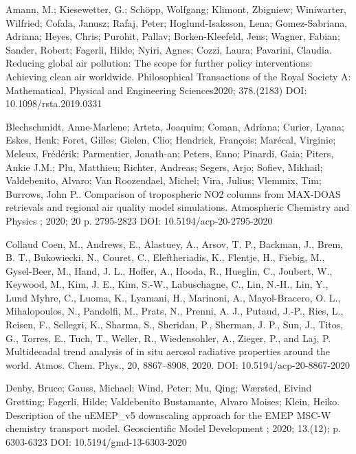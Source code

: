 \enlargethispage{\baselineskip}
\begin{list}{}{\setlength{\leftmargin}{15pt}\setlength{\itemindent}{-\leftmargin}}\small
\item[]
Amann, M.; Kiesewetter, G.; Schöpp, Wolfgang; Klimont, Zbigniew; Winiwarter, Wilfried; Cofala, Janusz; Rafaj, Peter; Hoglund-Isaksson, Lena; Gomez-Sabriana, Adriana; Heyes, Chris; Purohit, Pallav; Borken-Kleefeld, Jens; Wagner, Fabian; Sander, Robert; Fagerli, Hilde; Nyiri, Agnes; Cozzi, Laura; Pavarini, Claudia.
Reducing global air pollution: The scope for further policy interventions: Achieving clean air worldwide.
Philosophical Transactions of the Royal Society A: Mathematical, Physical and Engineering Sciences2020; 378.(2183)
DOI: 10.1098/rsta.2019.0331

\item[]
Blechschmidt, Anne-Marlene; Arteta, Joaquim; Coman, Adriana; Curier, Lyana; Eskes, Henk; Foret, Gilles; Gielen, Clio; Hendrick, François; Marécal, Virginie; Meleux, Frédérik; Parmentier, Jonath-an; Peters, Enno; Pinardi, Gaia; Piters, Ankie J.M.; Plu, Matthieu; Richter, Andreas; Segers, Arjo; Sofiev, Mikhail; Valdebenito, Alvaro; Van Roozendael, Michel; Vira, Julius; Vlemmix, Tim; Burrows, John P..
Comparison of tropospheric NO2 columns from MAX-DOAS retrievals and regional air quality model simulations.
Atmospheric Chemistry and Physics ; 2020; 20 p. 2795-2823
DOI: 10.5194/acp-20-2795-2020 

\item[]
Collaud Coen, M., Andrews, E., Alastuey, A., Arsov, T. P., Backman, J., Brem, B. T., Bukowiecki, N., Couret, C., Eleftheriadis, K., Flentje, H., Fiebig, M., Gysel-Beer, M., Hand, J. L., Hoffer, A., Hooda, R., Hueglin, C., Joubert, W., Keywood, M., Kim, J. E., Kim, S.-W., Labuschagne, C., Lin, N.-H., Lin, Y., Lund Myhre, C., Luoma, K., Lyamani, H., Marinoni, A., Mayol-Bracero, O. L., Mihalopoulos, N., Pandolfi, M., Prats, N., Prenni, A. J., Putaud, J.-P., Ries, L., Reisen, F., Sellegri, K., Sharma, S., Sheridan, P., Sherman, J. P., Sun, J., Titos, G., Torres, E., Tuch, T., Weller, R., Wiedensohler, A., Zieger, P., and Laj, P.
Multidecadal trend analysis of in situ aerosol radiative properties around the world.
Atmos. Chem. Phys., 20, 8867–8908, 2020.
DOI: 10.5194/acp-20-8867-2020 

\item[]
Denby, Bruce; Gauss, Michael; Wind, Peter; Mu, Qing; Wærsted, Eivind Grøtting; Fagerli, Hilde; Valdebenito Bustamante, Alvaro Moises; Klein, Heiko.
Description of the uEMEP\_v5 downscaling approach for the EMEP MSC-W chemistry transport model.
Geoscientific Model Development ; 2020; 13.(12); p. 6303-6323
DOI: 10.5194/gmd-13-6303-2020 


\end{list}
